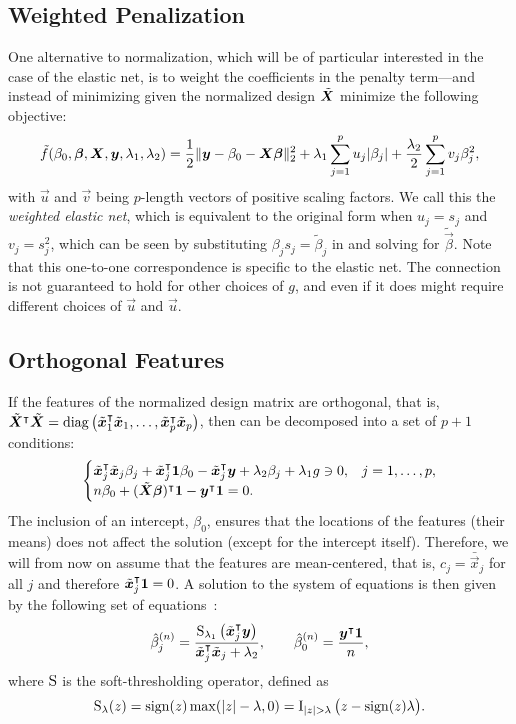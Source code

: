\subsection{Weighted Penalization}\label{sec:weighted-elasticnet}

One alternative to normalization, which will be of particular interested in the case of the
elastic net, is to weight the coefficients in the penalty term---and instead of minimizing
 given the normalized design \(\tilde{\boldsymbol{X}}\) minimize the
following objective:
\[
  \tilde{f}(\beta_0, \boldsymbol{\beta}, \boldsymbol{X}, \boldsymbol{y}, \lambda_1, \lambda_2) =
  \frac{1}{2} \lVert \boldsymbol{y} - \beta_0 - \boldsymbol{X}\boldsymbol{\beta}\rVert_2^2 + \lambda_1 \sum_{j=1}^p u_j |\beta_j| + \frac{\lambda_2}{2} \sum_{j=1}^p v_j \beta_j^2,
\]
with \(\vec{u}\) and \(\vec{v}\) being \(p\)-length vectors of positive scaling factors. We
call this the \emph{weighted elastic net}, which is equivalent to the original form when
\(u_j = s_j\) and \(v_j = s_j^2\), which can be seen by substituting \(\beta_js_j =
\tilde{\beta}_j\) in  and solving for \(\tilde{\vec{\beta}}\). Note
that this one-to-one correspondence is specific to the elastic net. The connection is not
guaranteed to hold for other choices of \(g\), and even if it does might require different
choices of \(\vec{u}\) and \(\vec{u}\).

\subsection{Orthogonal Features}

If the features of the normalized design matrix are orthogonal, that is,
\(\tilde{\boldsymbol{X}}^\intercal \tilde{\boldsymbol{X}} = \operatorname{diag}\left(\tilde{\boldsymbol{x}}_1^\intercal
\tilde{\boldsymbol{x}}_1, \dots, \tilde{\boldsymbol{x}}_p^\intercal \tilde{\boldsymbol{x}}_p\right) \), then
 can be decomposed into a set of \(p + 1\) conditions:
%
\[
  \begin{cases}
    \tilde{\boldsymbol{x}}_j^\intercal \tilde{\boldsymbol{x}}_j \beta_j + \tilde{\boldsymbol{x}}_j^\intercal \boldsymbol{1} \beta_0 - \tilde{\boldsymbol{x}}_j^\intercal\boldsymbol{y} + \lambda_2 \beta_j + \lambda_1 g \ni 0, & j=1,\dots,p, \\
    n \beta_0 + (\tilde{\boldsymbol{X}}\boldsymbol{\beta})^\intercal \boldsymbol{1} -  \boldsymbol{y}^\intercal \boldsymbol{1} = 0.
  \end{cases}
\]
%
The inclusion of an intercept, \(\beta_0\), ensures that the locations of the features
(their means) does not affect the solution (except for the intercept itself). Therefore, we
will from now on assume that the features are mean-centered, that is, \(c_j =
\bar{\vec{x}}_j\) for all \(j\) and therefore \(\tilde{\boldsymbol{x}}_j^\intercal \boldsymbol{1} = 0\). A
solution to the system of equations is then given by the following set of
equations~\citep{donoho1994}:
\begin{equation*}
  \label{eq:orthogonal-solution-normalized}
  \hat{\beta}^{(n)}_j = \frac{\operatorname{S}_{\lambda_1}\left(\tilde{\boldsymbol{x}}_j^\intercal \boldsymbol{y}\right)}{\tilde{\boldsymbol{x}}_j^\intercal \tilde{\boldsymbol{x}}_j + \lambda_2},
  \qquad
  \hat{\beta}_0^{(n)} = \frac{\boldsymbol{y}^\intercal \boldsymbol{1}}{n},
\end{equation*}
where \(\operatorname{S}\) is the soft-thresholding operator, defined as
\[
  \st_\lambda(z) = \sign(z) \max(|z| - \lambda, 0) = \ind{|z|>\lambda}\big(z - \sign(z)\lambda\big).
\]

